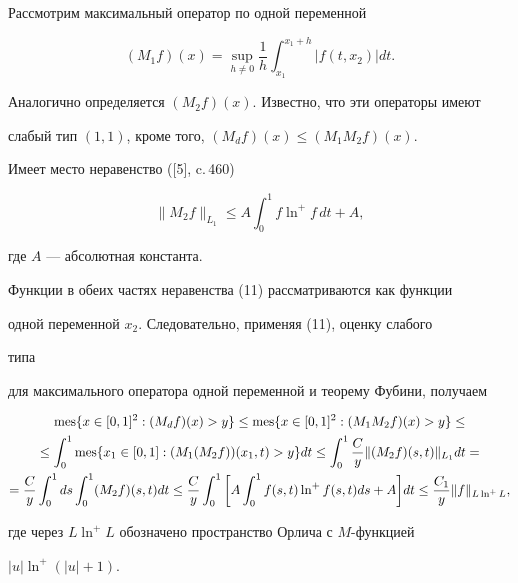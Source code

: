  


\begin{pf} 


Рассмотрим максимальный оператор по одной переменной 


$$ 


(M_1f)(x)=\sup_{h\ne0}\frac{1}{h} 


\int^{x_1+h}_{x_1}|f(t,x_2)|dt. 


$$ 


Аналогично определяется $(M_2f)(x)$. Известно, что эти операторы имеют 


слабый тип $(1,1)$, кроме того, $(M_d f)(x)\le(M_1M_2f)(x)$. 


Имеет место неравенство ([5], c.\,460) 


\begin{equation} 


\|M_2f\|_{L_1}\le A\int^1_0 f\ln^+f\,dt+A, 


\end{equation} 


где $A$ --- абсолютная константа. 


Функции в обеих частях неравенства (11) рассматриваются как функции 


одной переменной $x_2$. Следовательно, применяя (11), оценку слабого 


типа 


для максимального оператора одной переменной и теорему Фубини, получаем 


\begin{multline*} 


\mes\{x\in[0,1]^2:(M_d f)(x)>y\}\le 


\mes\{x\in[0,1]^2:(M_1M_2f)(x)>y\}\le \\ 


% 


\le\int^1_0\mes\{x_1\in[0,1]:(M_1(M_2f))(x_1,t)>y\}dt\le 


\int^1_0\frac{C}{y}\|(M_2f)(s,t)\|_{L_1}dt= \\ 


% 


=\frac{C}{y}\int^1_0 ds\int^1_0(M_2f)(s,t)dt\le 


\frac{C}{y}\int^1_0\bigg[A\int^1_0 


f(s,t)\ln^+f(s,t)ds+A\bigg]dt\le\frac{C_1}{y}\|f\|_{L\ln^+L}, 


\end{multline*} 


где через $L\ln^+L$ обозначено пространство Орлича с $M$-функцией 


$|u|\ln^+(|u|+1)$. 


\end{pf} 


